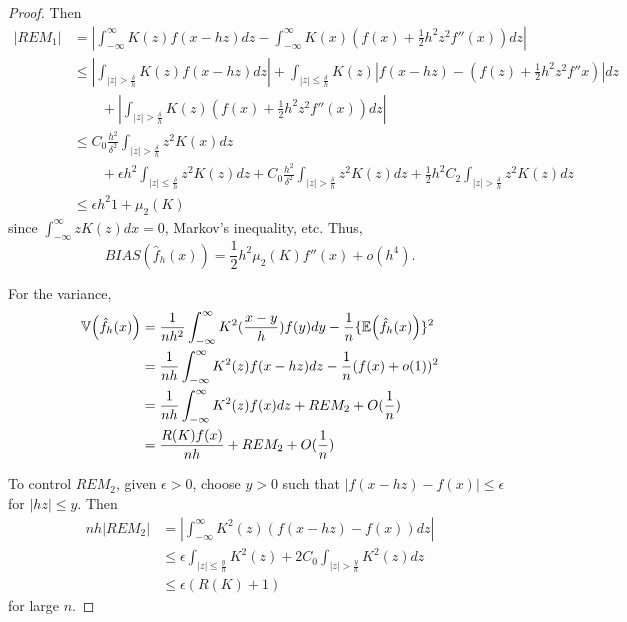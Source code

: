 \begin{proof}
  Then
  \begin{align}
    \label{eq:18}
    |REM_{1}| &= | \int_{-\infty}^{\infty} K(z) f(x - hz) dz -
    \int_{-\infty}^{\infty} K(x)(f(x) + \frac{1}{2} h^{2} z^{2} f''(x))
    dz | \\
    &\leq | \int_{|z| > \frac{\delta}{h}} K(z) f(x - hz) dz| +
    \int_{|z| \leq \frac{\delta}{h}} K(z)|f(x-hz) - (f(z) +
    \frac{1}{2}h^{2} z^{2} f''x)| dz \\
    &\qquad+ | \int_{|z| > \frac{\delta}{h}}
    K(z) (f(x) + \frac{1}{2} h^{2} z^{2} f''(x)) dz| \\
    &\leq C_{0} \frac{h^{2}}{\delta^{2}} \int_{|z| > \frac{\delta}{h}}
    z^{2} K(x) dz \\
    &\qquad+ \epsilon h^{2} \int_{|z| \leq \frac{\delta}{h}}
    z^{2} K(z) dz + C_{0} \frac{h^{2}}{\delta^{2}} \int_{|z| >
      \frac{\delta}{h}} z^{2} K(z) dz + \frac{1}{2} h^{2} C_{2}
    \int_{|z| > \frac{\delta}{h}} z^{2} K(z) dz \\
    &\leq \epsilon h^{2}{1 + \mu_{2}(K)}
  \end{align}
  since $\int_{-\infty}^{\infty} z K(z) dx = 0$, Markov's inequality, etc.
  Thus,
  \begin{equation}
    \label{eq:19}
    BIAS(\hat f_{h}(x)) = \frac{1}{2} h^{2} \mu_{2}(K) f''(x) + o(h^{4}).
  \end{equation}

  For the variance,
  \begin{align}
    \label{eq:20}
    \Var{\hat f_{h}(x)} &= \frac{1}{nh^{2}} \int_{-\infty}^{\infty}
    K^{2}(\frac{x-y}{h}) f(y) dy - \frac{1}{n} \{\E{\hat f_{h}(x)}
    \}^{2} \\
    &= \frac{1}{nh} \int_{-\infty}^{\infty} K^{2}(z) f(x - hz) dz -
    \frac{1}{n} (f(x) + o(1))^{2} \\
    &= \frac{1}{nh} \int_{-\infty}^{\infty} K^{2}(z) f(x) dz + REM_{2} +
    O(\frac{1}{n}) \\
    &= \frac{R(K) f(x)}{nh} + REM_{2} + O(\frac{1}{n})
  \end{align}

  To control $REM_{2}$, given $\epsilon > 0$, choose $y > 0$ such that
  $|f(x - hz) - f(x)| \leq \epsilon$ for $|hz| \leq y$.  Then
  \begin{align}
    \label{eq:21}
    nh | REM_{2} | &= | \int_{-\infty}^{\infty} K^{2}(z) (f(x - hz) -
    f(x)) dz | \\
    &\leq \epsilon \int_{|z| \leq \frac{y}{h}} K^{2}(z) + 2 C_{0}
    \int_{|z| > \frac{y}{h}} K^{2}(z) dz \\
    &\leq \epsilon(R(K) + 1)
  \end{align}
  for large $n$.


\end{proof}
